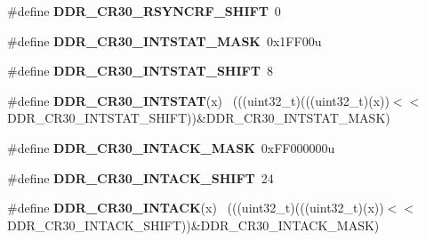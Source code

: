 \begin{DoxyCompactItemize}
\item 
\hypertarget{group___d_d_r___register___masks_ga5bd020ece22c76bf8ee5a91a022ca865}{}\#define {\bfseries D\+D\+R\+\_\+\+C\+R30\+\_\+\+R\+S\+Y\+N\+C\+R\+F\+\_\+\+S\+H\+I\+F\+T}~0\label{group___d_d_r___register___masks_ga5bd020ece22c76bf8ee5a91a022ca865}

\item 
\hypertarget{group___d_d_r___register___masks_ga063b0675be83a281bc84337b29a8c82d}{}\#define {\bfseries D\+D\+R\+\_\+\+C\+R30\+\_\+\+I\+N\+T\+S\+T\+A\+T\+\_\+\+M\+A\+S\+K}~0x1\+F\+F00u\label{group___d_d_r___register___masks_ga063b0675be83a281bc84337b29a8c82d}

\item 
\hypertarget{group___d_d_r___register___masks_ga7c2a74de209352bb03d72112adfd7ad9}{}\#define {\bfseries D\+D\+R\+\_\+\+C\+R30\+\_\+\+I\+N\+T\+S\+T\+A\+T\+\_\+\+S\+H\+I\+F\+T}~8\label{group___d_d_r___register___masks_ga7c2a74de209352bb03d72112adfd7ad9}

\item 
\hypertarget{group___d_d_r___register___masks_ga193fee2fee25e87848dcd95dc2582a2b}{}\#define {\bfseries D\+D\+R\+\_\+\+C\+R30\+\_\+\+I\+N\+T\+S\+T\+A\+T}(x)                                        ~(((uint32\+\_\+t)(((uint32\+\_\+t)(x))$<$$<$D\+D\+R\+\_\+\+C\+R30\+\_\+\+I\+N\+T\+S\+T\+A\+T\+\_\+\+S\+H\+I\+F\+T))\&D\+D\+R\+\_\+\+C\+R30\+\_\+\+I\+N\+T\+S\+T\+A\+T\+\_\+\+M\+A\+S\+K)\label{group___d_d_r___register___masks_ga193fee2fee25e87848dcd95dc2582a2b}

\item 
\hypertarget{group___d_d_r___register___masks_gac4fe95a26cb4bba2dfc4e05bac6676af}{}\#define {\bfseries D\+D\+R\+\_\+\+C\+R30\+\_\+\+I\+N\+T\+A\+C\+K\+\_\+\+M\+A\+S\+K}~0x\+F\+F000000u\label{group___d_d_r___register___masks_gac4fe95a26cb4bba2dfc4e05bac6676af}

\item 
\hypertarget{group___d_d_r___register___masks_ga817cd84b63058ddc4d6a04ea7dcdb7e3}{}\#define {\bfseries D\+D\+R\+\_\+\+C\+R30\+\_\+\+I\+N\+T\+A\+C\+K\+\_\+\+S\+H\+I\+F\+T}~24\label{group___d_d_r___register___masks_ga817cd84b63058ddc4d6a04ea7dcdb7e3}

\item 
\hypertarget{group___d_d_r___register___masks_ga545f1f3f7f91e36b2ad106084e5af20e}{}\#define {\bfseries D\+D\+R\+\_\+\+C\+R30\+\_\+\+I\+N\+T\+A\+C\+K}(x)                                          ~(((uint32\+\_\+t)(((uint32\+\_\+t)(x))$<$$<$D\+D\+R\+\_\+\+C\+R30\+\_\+\+I\+N\+T\+A\+C\+K\+\_\+\+S\+H\+I\+F\+T))\&D\+D\+R\+\_\+\+C\+R30\+\_\+\+I\+N\+T\+A\+C\+K\+\_\+\+M\+A\+S\+K)\label{group___d_d_r___register___masks_ga545f1f3f7f91e36b2ad106084e5af20e}


\end{DoxyCompactItemize}
